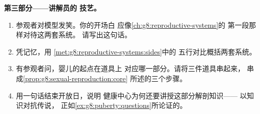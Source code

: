 \begin{problem}
\medskip\noindent\textbf{第三部分——讲解员的
技艺。}
\begin{enumerate}[resume]
  \item 参观者对模型发笑。你的开场白
        应像\cref{ch:g8:reproductive-systems}的
        第一段那样对待这两套系统。
        请写出这句话。
  \item 凭记忆，用
        \cref{met:g8:reproductive-systems:sides}中的
        五行对比概括两套系统。
  \item 有参观者问，婴儿的起点在道具上
        对应哪一部分。请将三件道具串起来，
        串成\cref{prop:g8:sexual-reproduction:core}
        所述的三个步骤。
  \item 用一句话结束开放日，说明
        健康中心为何还要讲授这部分解剖知识——
        以知识对抗传说，
        正如\cref{ex:g8:puberty:questions}所论证的。
\end{enumerate}
\end{problem}
